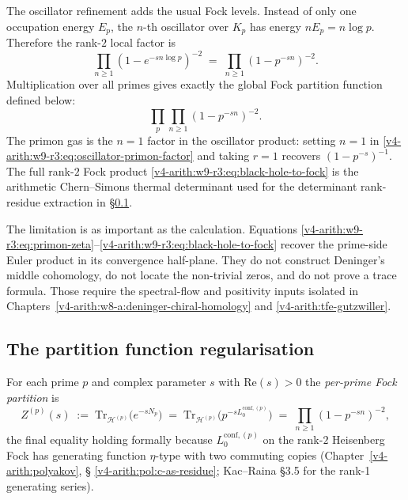 The oscillator refinement adds the usual Fock levels. Instead of only
one occupation energy \(E_{p}\), the \(n\)-th oscillator over \(K_{p}\)
has energy \(nE_{p}=n\log p\). Therefore the rank-\(2\) local factor is
\begin{equation}
\label{v4-arith:w9-r3:eq:oscillator-primon-factor}
\prod_{n\geq1}(1-e^{-s n\log p})^{-2}
\;=\;\prod_{n\geq1}(1-p^{-sn})^{-2}.
\end{equation}
Multiplication over all primes gives exactly the global Fock
partition function defined below:
\begin{equation}
\label{v4-arith:w9-r3:eq:black-hole-to-fock}
\prod_{p}\prod_{n\geq1}(1-p^{-sn})^{-2}.
\end{equation}
The primon gas is the \(n=1\) factor in the oscillator product: setting
\(n=1\) in \eqref{v4-arith:w9-r3:eq:oscillator-primon-factor} and taking
\(r=1\) recovers \((1-p^{-s})^{-1}\). The full rank-\(2\) Fock product
\eqref{v4-arith:w9-r3:eq:black-hole-to-fock} is the arithmetic
Chern--Simons thermal determinant used for the determinant
rank-residue extraction in \S\ref{v4-arith:w9-r3:partition-reg}.

The limitation is as important as the calculation. Equations
\eqref{v4-arith:w9-r3:eq:primon-zeta}--\eqref{v4-arith:w9-r3:eq:black-hole-to-fock}
recover the prime-side Euler product in its convergence half-plane.
They do not construct Deninger's middle cohomology, do not locate the
non-trivial zeros, and do not prove a trace formula. Those require the
spectral-flow and positivity inputs isolated in
Chapters~\ref{v4-arith:w8-a:deninger-chiral-homology} and
\ref{v4-arith:tfe-gutzwiller}.

\subsection{The partition function regularisation}
\label{v4-arith:w9-r3:partition-reg}

\begin{definition}
\label{v4-arith:w9-r3:def:per-prime-partition}
For each prime \(p\) and complex parameter
\(s\) with \(\mathrm{Re}(s)>0\) the \emph{per-prime Fock partition} is
\begin{equation}
\label{v4-arith:w9-r3:eq:per-prime-Z}
Z^{(p)}(s)\;:=\;\mathrm{Tr}_{\mathcal{H}^{(p)}}\bigl(e^{-sN_{p}}\bigr)
\;=\;\mathrm{Tr}_{\mathcal{H}^{(p)}}\bigl(p^{-sL_{0}^{\mathrm{conf},(p)}}\bigr)
\;=\;\prod_{n\geq 1}(1-p^{-sn})^{-2},
\end{equation}
the final equality holding formally because \(L_{0}^{\mathrm{conf},(p)}\)
on the rank-\(2\) Heisenberg Fock has generating function \(\eta\)-type with
two commuting copies (Chapter~\ref{v4-arith:polyakov}, \S
\ref{v4-arith:pol:c-as-residue}; Kac--Raina \S 3.5 for the rank-1
generating series).
\end{definition}

